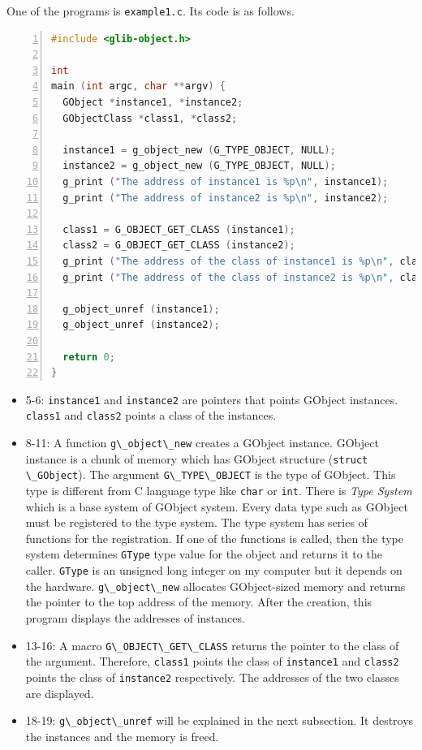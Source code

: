 One of the programs is \passthrough{\lstinline!example1.c!}. Its code is
as follows.

\begin{lstlisting}[language=C, numbers=left]
#include <glib-object.h>

int
main (int argc, char **argv) {
  GObject *instance1, *instance2;
  GObjectClass *class1, *class2;
  
  instance1 = g_object_new (G_TYPE_OBJECT, NULL);
  instance2 = g_object_new (G_TYPE_OBJECT, NULL);
  g_print ("The address of instance1 is %p\n", instance1);
  g_print ("The address of instance2 is %p\n", instance2);

  class1 = G_OBJECT_GET_CLASS (instance1);
  class2 = G_OBJECT_GET_CLASS (instance2);
  g_print ("The address of the class of instance1 is %p\n", class1);
  g_print ("The address of the class of instance2 is %p\n", class2);

  g_object_unref (instance1);
  g_object_unref (instance2);

  return 0;
}
\end{lstlisting}

\begin{itemize}
\tightlist
\item
  5-6: \passthrough{\lstinline!instance1!} and
  \passthrough{\lstinline!instance2!} are pointers that points GObject
  instances. \passthrough{\lstinline!class1!} and
  \passthrough{\lstinline!class2!} points a class of the instances.
\item
  8-11: A function \passthrough{\lstinline!g\_object\_new!} creates a
  GObject instance. GObject instance is a chunk of memory which has
  GObject structure (\passthrough{\lstinline!struct \_GObject!}). The
  argument \passthrough{\lstinline!G\_TYPE\_OBJECT!} is the type of
  GObject. This type is different from C language type like
  \passthrough{\lstinline!char!} or \passthrough{\lstinline!int!}. There
  is \emph{Type System} which is a base system of GObject system. Every
  data type such as GObject must be registered to the type system. The
  type system has series of functions for the registration. If one of
  the functions is called, then the type system determines
  \passthrough{\lstinline!GType!} type value for the object and returns
  it to the caller. \passthrough{\lstinline!GType!} is an unsigned long
  integer on my computer but it depends on the hardware.
  \passthrough{\lstinline!g\_object\_new!} allocates GObject-sized
  memory and returns the pointer to the top address of the memory. After
  the creation, this program displays the addresses of instances.
\item
  13-16: A macro \passthrough{\lstinline!G\_OBJECT\_GET\_CLASS!} returns
  the pointer to the class of the argument. Therefore,
  \passthrough{\lstinline!class1!} points the class of
  \passthrough{\lstinline!instance1!} and
  \passthrough{\lstinline!class2!} points the class of
  \passthrough{\lstinline!instance2!} respectively. The addresses of the
  two classes are displayed.
\item
  18-19: \passthrough{\lstinline!g\_object\_unref!} will be explained in
  the next subsection. It destroys the instances and the memory is
  freed.
\end{itemize}

